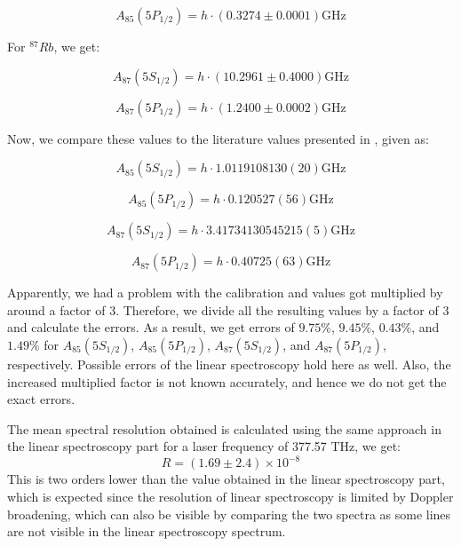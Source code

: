 \documentclass[12pt]{article}
\begin{document}
\begin{equation*}
A_{85}\left(5 P_{1 / 2}\right)=h \cdot(0.3274 \pm 0.0001) \mathrm{GHz}
\end{equation*}

For $^{87}Rb$, we get:

\begin{equation*}
A_{87}\left(5 S_{1 / 2}\right)=h \cdot(10.2961 \pm 0.4000) \mathrm{GHz}
\end{equation*}

\begin{equation*}
A_{87}\left(5 P_{1 / 2}\right)=h \cdot(1.2400 \pm 0.0002) \mathrm{GHz}
\end{equation*}

Now, we compare these values to the literature values presented in \cite{Rb85}\cite{Rb87}, given as:

\begin{equation*}
A_{85}\left(5 S_{1 / 2}\right)=h \cdot 1.011 910 813 0(20)  \mathrm{GHz}
\end{equation*}


\begin{equation*}
A_{85}\left(5 P_{1 / 2}\right)=h \cdot  0.120 527(56) \mathrm{GHz}
\end{equation*}


\begin{equation*}
A_{87}\left(5 S_{1 / 2}\right)=h \cdot3.417 341 305 452 15(5) \mathrm{GHz}
\end{equation*}

\begin{equation*}
A_{87}\left(5 P_{1 / 2}\right)=h \cdot 0.407 25(63) \mathrm{GHz}
\end{equation*}

Apparently, we had a problem with the calibration and values got multiplied by around a factor of 3. Therefore, we divide all the resulting values by a factor of 3 and calculate the errors. As a result, we get errors of $9.75\%$, $9.45\%$, $0.43\%$, and $1.49\%$ for $A_{85}\left(5 S_{1 / 2}\right)$, 
$A_{85}\left(5 P_{1 / 2}\right)$, 
$A_{87}\left(5 S_{1 / 2}\right)$, and $A_{87}\left(5 P_{1 / 2}\right)$, respectively. Possible errors of the linear spectroscopy hold here as well. Also, the increased multiplied factor is not known accurately, and hence we do not get the exact errors. 

The mean spectral resolution obtained is calculated using the same approach in the linear spectroscopy part for a laser frequency of 377.57 THz, we get:
\begin{equation*}
    R = (1.69 \pm 2.4) \times 10^{-8}
\end{equation*}
This is two orders lower than the value obtained in the linear spectroscopy part, which is expected since the resolution of linear spectroscopy is limited by Doppler broadening, which can also be visible by comparing the two spectra as some lines are not visible in the linear spectroscopy spectrum. 
\end{document}
